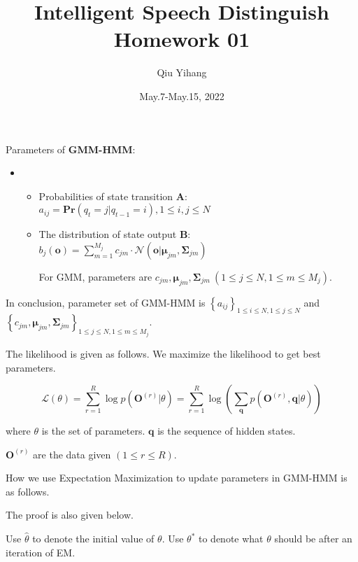 \documentclass{article}
\title{\textbf{Intelligent Speech Distinguish Homework 01}}
\author{Qiu Yihang}
\date{May.7-May.15, 2022}
\renewcommand{\Pr}[1]{\mathbf{Pr}\left(#1\right)}
\begin{document}
\maketitle

Parameters of \textbf{GMM-HMM}:

\vspace{-0.3em}
\begin{itemize}
    \item[] \begin{itemize}
        \item Probabilities of state transition $\boldsymbol{A}$: $a_{ij}=\Pr{q_t=j|q_{t-1}=i}, 1\le i,j\le N$
        \item The distribution of state output $\boldsymbol{B}$: $b_j(\mathbf{o})=\sum_{m=1}^{M_j}c_{jm}\cdot\mathcal{N}(\mathbf{o}|\boldsymbol{\mu}_{jm},\boldsymbol{\Sigma}_{jm})$
        
        For GMM, parameters are $c_{jm},\boldsymbol{\mu}_{jm},\boldsymbol{\Sigma}_{jm}\ (1\le j\le N, 1\le m \le M_j)$.
    \end{itemize}
\end{itemize}

\vspace{-0.3em}
In conclusion, parameter set of GMM-HMM is $\left\{a_{ij}\right\}_{1\le i\le N,1 \le j\le N}$ and $\left\{c_{jm}, \boldsymbol{\mu}_{jm},\boldsymbol{\Sigma}_{jm}\right\}_{1\le j\le N, 1\le m\le M_j}$.


The likelihood is given as follows. We maximize the likelihood to get best parameters.

\vspace{-0.5em}
$$\mathcal{L}(\theta)=\sum_{r=1}^R\log{p\left(\mathbf{O}^{(r)}|\theta\right)}=\sum_{r=1}^R\log\left(\sum_{\mathbf{q}}p(\mathbf{O}^{(r)},\mathbf{q}|\theta)\right)$$

\vspace{-0.5em}\hspace{2em}
where $\theta$ is the set of parameters. $\mathbf{q}$ is the sequence of hidden states. 

\hspace{2em}
$\mathbf{O}^{(r)}$ are the data given $(1\le r\le R)$.

\vspace{1em} 
How we use Expectation Maximization to update parameters in GMM-HMM is as follows.

The proof is also given below.

\vspace{2em} 
Use $\hat{\theta}$ to denote the initial value of $\theta$. Use $\theta^*$ to denote what $\theta$ should be after an iteration of EM.
\end{document}
